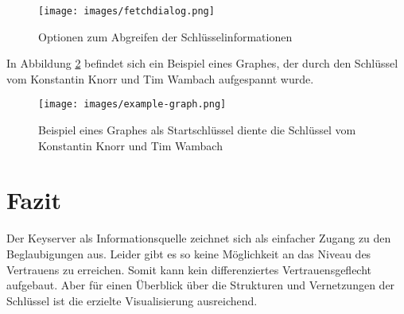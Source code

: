 \documentclass[11pt,a4paper]{scrartcl}
\begin{document}
\begin{figure}
\centering
\texttt{[image: images/fetchdialog.png]}
\caption{Optionen zum Abgreifen der Schlüsselinformationen}
\label{fig:fetchdialog}
\end{figure}

In Abbildung \ref{fig:examplegraph} befindet sich ein Beispiel eines Graphes, der durch den Schlüssel vom Konstantin Knorr und Tim Wambach aufgespannt wurde.

\begin{figure}
\centering
\texttt{[image: images/example-graph.png]}
\caption{Beispiel eines Graphes als Startschlüssel diente die Schlüssel vom Konstantin Knorr und Tim Wambach}
\label{fig:examplegraph}
\end{figure}

\section{Fazit}

Der Keyserver als Informationsquelle zeichnet sich als einfacher Zugang zu den Beglaubigungen aus.
Leider gibt es so keine Möglichkeit an das Niveau des Vertrauens zu erreichen. Somit kann kein differenziertes Vertrauensgeflecht aufgebaut. Aber für einen Überblick über die Strukturen und Vernetzungen der Schlüssel ist die erzielte Visualisierung ausreichend.
\end{document}
